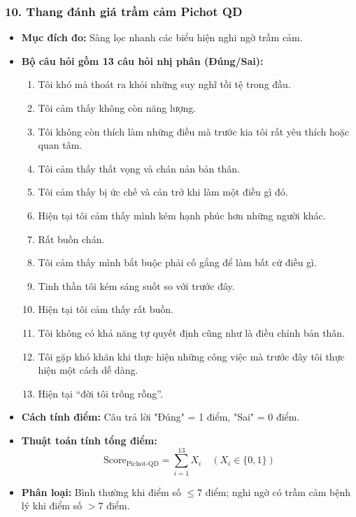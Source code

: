 \documentclass[12pt,a4paper]{article}
\begin{document}
\subsubsection*{10. Thang đánh giá trầm cảm Pichot QD}
\begin{itemize}
    \item \textbf{Mục đích đo:} Sàng lọc nhanh các biểu hiện nghi ngờ trầm cảm.
    \item \textbf{Bộ câu hỏi gồm 13 câu hỏi nhị phân (Đúng/Sai):}
    \begin{enumerate}
        \item Tôi khó mà thoát ra khỏi những suy nghĩ tồi tệ trong đầu.
        \item Tôi cảm thấy không còn năng lượng.
        \item Tôi không còn thích làm những điều mà trước kia tôi rất yêu thích hoặc quan tâm.
        \item Tôi cảm thấy thất vọng và chán nản bản thân.
        \item Tôi cảm thấy bị ức chế và cản trở khi làm một điều gì đó.
        \item Hiện tại tôi cảm thấy mình kém hạnh phúc hơn những người khác.
        \item Rất buồn chán.
        \item Tôi cảm thấy mình bắt buộc phải cố gắng để làm bất cứ điều gì.
        \item Tinh thần tôi kém sáng suốt so với trước đây.
        \item Hiện tại tôi cảm thấy rất buồn.
        \item Tôi không có khả năng tự quyết định cũng như là điều chỉnh bản thân.
        \item Tôi gặp khó khăn khi thực hiện những công việc mà trước đây tôi thực hiện một cách dễ dàng.
        \item Hiện tại ``đời tôi trống rỗng''.
    \end{enumerate}
    \item \textbf{Cách tính điểm:} Câu trả lời "Đúng" = 1 điểm, "Sai" = 0 điểm.
    \item \textbf{Thuật toán tính tổng điểm:}
    \begin{equation}
        \text{Score}_{\text{Pichot-QD}} = \sum_{i=1}^{13} X_i \quad (X_i \in \{0, 1\})
    \end{equation}
    \item \textbf{Phân loại:} Bình thường khi điểm số $\le 7$ điểm; nghi ngờ có trầm cảm bệnh lý khi điểm số $> 7$ điểm.
\end{itemize}
\end{document}
